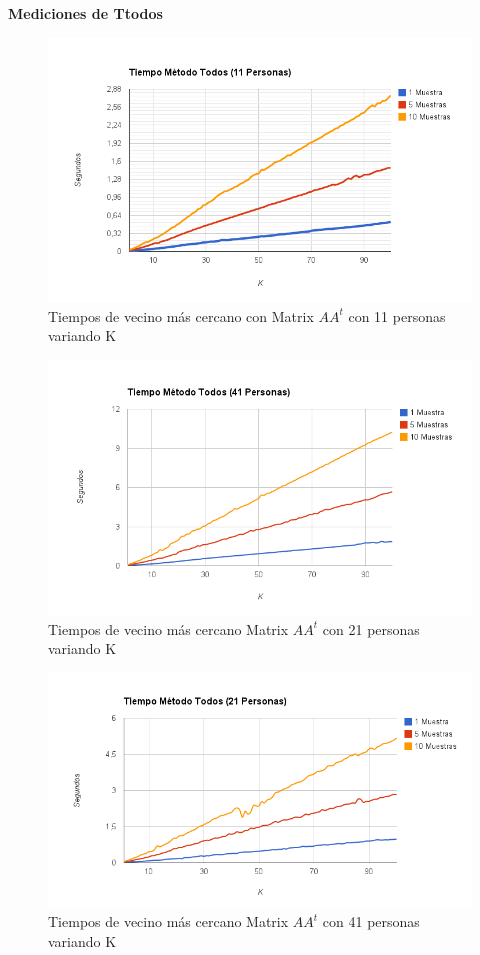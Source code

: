 \textbf{Mediciones de Ttodos }

\begin{figure}[H]
\includegraphics[width=1\textwidth]{img/imagef4.png}
     \caption{Tiempos de vecino más cercano con Matrix $AA^t$ con 11 personas variando K}
\end{figure}

\begin{figure}[H]
\includegraphics[width=1\textwidth]{img/imagef5.png}
     \caption{Tiempos de vecino más cercano Matrix $AA^t$ con 21 personas variando K}
\end{figure}

\begin{figure}[H]
\includegraphics[width=1\textwidth]{img/imagef6.png}
     \caption{Tiempos de vecino más cercano Matrix $AA^t$ con 41 personas variando K}
\end{figure}


